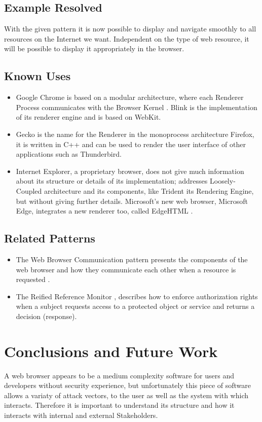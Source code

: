 \documentclass[prodmode,acmtecs]{acmsmall}
\begin{document}
  \subsection*{Example Resolved}
With the given pattern it is now possible to display and navigate smoothly to all resources on the Internet we want. Independent on the type of web resource, it will be possible to display it appropriately in the browser. 
  \subsection*{Known Uses}
  \begin{itemize}\leftskip0.2em
    \item Google Chrome is based on a modular architecture, where each Renderer Process communicates with the Browser Kernel \cite{multiProcGC}. Blink is the implementation of its renderer engine and is based on WebKit.
    \item Gecko \cite{gecko2} is the name for the Renderer in the monoprocess architecture Firefox, it is written in C++ and can be used to render the user interface of other applications such as Thunderbird.
    \item Internet Explorer, a proprietary browser, does not give much information about its structure or details of its implementation; \cite{Crowley2010} addresses Loosely-Coupled architecture \cite{IE8-LCIE} and its components, like Trident its Rendering Engine, but without giving further details. Microsoft's new web browser, Microsoft Edge, integrates a new renderer too, called EdgeHTML \cite{edgehtml}.
  \end{itemize}

  \subsection*{Related Patterns}
  \begin{itemize}\leftskip0.2em
    \item The Web Browser Communication pattern presents the components of the web browser and how they communicate each other when a resource is requested \cite{silva2015}. 
    \item The Reified Reference Monitor \cite{fernandez2013security}, describes how to enforce authorization rights when a subject requests access to a protected object or service and returns a decision (response). 
  \end{itemize}

\section{Conclusions and Future Work}
A web browser appears to be a medium complexity software for users and developers without security experience, but unfortunately this piece of software allows a variaty of attack vectors, to the user as well as the system with which interacts. Therefore it is important to understand its structure and how it interacts with internal and external Stakeholders.
\end{document}
